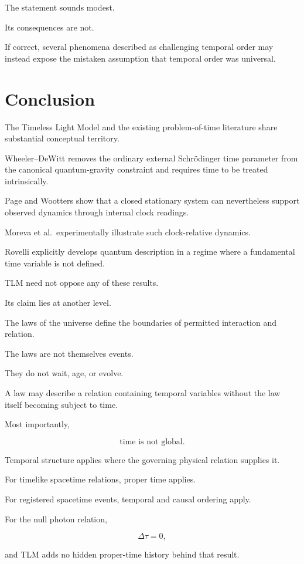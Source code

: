 \documentclass[12pt,onecolumn]{article}
\theoremstyle{plain}
\theoremstyle{definition}
\theoremstyle{remark}
\begin{document}
The statement sounds modest.

Its consequences are not.

If correct, several phenomena described as challenging temporal order may
instead expose the mistaken assumption that temporal order was universal.


\section{Conclusion}

The Timeless Light Model and the existing problem-of-time literature share
substantial conceptual territory.

Wheeler--DeWitt removes the ordinary external Schr\"odinger time parameter
from the canonical quantum-gravity constraint and requires time to be
treated intrinsically.

Page and Wootters show that a closed stationary system can nevertheless
support observed dynamics through internal clock readings.

Moreva et al.\ experimentally illustrate such clock-relative dynamics.

Rovelli explicitly develops quantum description in a regime where a
fundamental time variable is not defined.

TLM need not oppose any of these results.

Its claim lies at another level.

The laws of the universe define the boundaries of permitted interaction
and relation.

The laws are not themselves events.

They do not wait, age, or evolve.

A law may describe a relation containing temporal variables without the law
itself becoming subject to time.

Most importantly,

\[
\boxed{
\text{time is not global}.
}
\]

Temporal structure applies where the governing physical relation supplies
it.

For timelike spacetime relations, proper time applies.

For registered spacetime events, temporal and causal ordering apply.

For the null photon relation,

\[
\Delta\tau=0,
\]

and TLM adds no hidden proper-time history behind that result.
\end{document}
